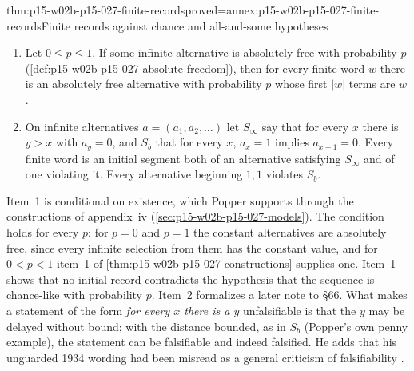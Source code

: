 \begin{hbtheorem}{thm:p15-w02b-p15-027-finite-records}{proved=annex:p15-w02b-p15-027-finite-records}{Finite records against chance and all-and-some hypotheses}
\begin{enumerate}
\item Let \(0\leq p\leq1\). If some infinite alternative is absolutely free with
  probability \(p\) (\cref{def:p15-w02b-p15-027-absolute-freedom}), then
  for every finite word \(w\) there is an absolutely free alternative
  with probability \(p\) whose first \(|w|\) terms are \(w\).
\item On infinite alternatives \(a=(a_1,a_2,\ldots)\) let
  \(S_\infty\) say that for every \(x\) there is \(y>x\) with \(a_y=0\),
  and \(S_b\) that for every \(x\), \(a_x=1\) implies \(a_{x+1}=0\).
  Every finite word is an initial segment both of an alternative
  satisfying \(S_\infty\) and of one violating it. Every alternative
  beginning \(1,1\) violates \(S_b\).
\end{enumerate}
\end{hbtheorem}

Item~1 is conditional on existence, which Popper supports through the
constructions of appendix~iv (\cref{sec:p15-w02b-p15-027-models}). The
condition holds for every \(p\): for \(p=0\) and \(p=1\) the constant
alternatives are absolutely free, since every infinite selection from
them has the constant value, and for \(0<p<1\) item~1 of
\cref{thm:p15-w02b-p15-027-constructions} supplies one. Item~1 shows that no initial record contradicts the hypothesis that
the sequence is chance-like with probability \(p\). Item~2 formalizes a
later note to \S66. What makes a statement of the form \emph{for every
\(x\) there is a \(y\)} unfalsifiable is that the \(y\) may be delayed
without bound; with the distance bounded, as in \(S_b\) (Popper's own
penny example), the statement can be falsifiable and indeed falsified.
He adds that his unguarded 1934 wording had been misread as a general
criticism of falsifiability \parencite[\S66, note~*2]{Popper2002LogicDiscoveryUI}.

